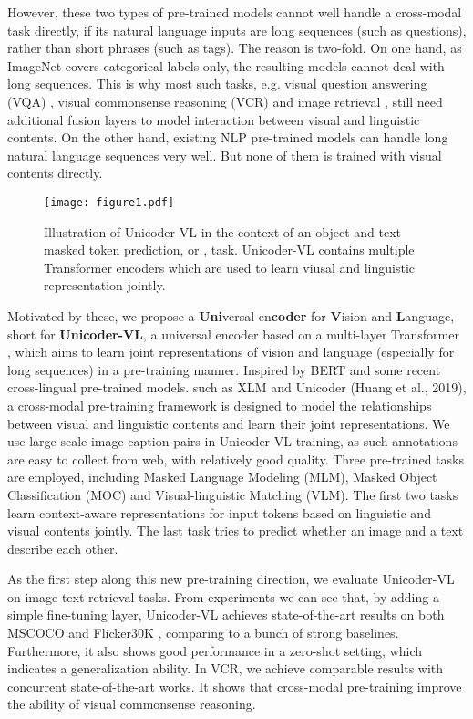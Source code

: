 \documentclass[letterpaper]{article} \usepackage{aaai20}  \usepackage{times}  \usepackage{helvet} \usepackage{courier}  \usepackage[hyphens]{url}  \usepackage{graphicx} \urlstyle{rm} \def\UrlFont{\rm}  \usepackage{graphicx}  \frenchspacing  \setlength{\pdfpagewidth}{8.5in}  \setlength{\pdfpageheight}{11in}  \usepackage{amssymb}
\begin{document}
However, these two types of pre-trained models cannot well handle a cross-modal task directly, if its natural language inputs are long sequences (such as questions), rather than short phrases (such as tags). The reason is two-fold. On one hand, as ImageNet covers categorical labels only, the resulting models cannot deal with long sequences. This is why most such tasks, e.g. visual question answering (VQA) \cite{antol2015vqa}, visual commonsense reasoning (VCR) \cite{zellers2019recognition} and image retrieval \cite{karpathy2015deep}, still need additional fusion layers to model interaction between visual and linguistic contents.
On the other hand, existing NLP pre-trained models can handle long natural language sequences very well. But none of them is trained with visual contents directly.

\begin{figure*}[!htbp]
	\centering
	\texttt{[image: figure1.pdf]}
	\caption{Illustration of Unicoder-VL in the context of an object and text masked token prediction, or , task. Unicoder-VL contains multiple Transformer encoders which are used to learn viusal and linguistic representation jointly.}
	\label{fig:pretraintask}
\end{figure*}

Motivated by these, we propose a \textbf{Uni}versal en\textbf{coder} for \textbf{V}ision and \textbf{L}anguage, short for \textbf{Unicoder-VL}, a universal encoder based on a multi-layer Transformer \cite{vaswani2017attention}, which aims to learn joint representations of vision and language (especially for long sequences) in a pre-training manner.
Inspired by BERT and some recent cross-lingual pre-trained models. such as XLM \cite{lample2019cross} and Unicoder (Huang et al., 2019), a cross-modal pre-training framework is designed to model the relationships between visual and linguistic contents and learn their joint representations.
We use large-scale image-caption pairs in Unicoder-VL training, as such annotations are easy to collect from web, with relatively good quality. 
Three pre-trained tasks are employed, including Masked Language Modeling (MLM), Masked Object Classification (MOC) and Visual-linguistic Matching (VLM). The first two tasks learn context-aware representations for input tokens based on linguistic and visual contents jointly. The last task tries to predict whether an image and a text describe each other.

As the first step along this new pre-training direction, we evaluate Unicoder-VL on image-text retrieval tasks. From experiments we can see that, by adding a simple fine-tuning layer, Unicoder-VL achieves state-of-the-art results on both MSCOCO \cite{chen2015microsoft} and Flicker30K \cite{young2014image}, comparing to a bunch of strong baselines. Furthermore, it also shows good performance in a zero-shot setting, which indicates a generalization ability. In VCR, we achieve comparable results with concurrent state-of-the-art works. It shows that cross-modal pre-training improve the ability of visual commonsense reasoning.
\end{document}
